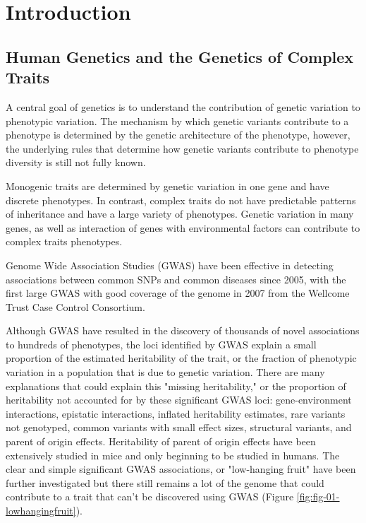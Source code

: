 \chapter{Introduction}

\section{Human Genetics and the Genetics of Complex Traits}

A central goal of genetics is to understand the contribution of genetic variation to phenotypic variation. The mechanism by which genetic variants contribute to a phenotype is determined by the genetic architecture of the phenotype, however, the underlying rules that determine how genetic variants contribute to phenotype diversity is still not fully known. 

Monogenic traits are determined by genetic variation in one gene and have discrete phenotypes. In contrast, complex traits do not have predictable patterns of inheritance and have a large variety of phenotypes. Genetic variation in many genes, as well as interaction of genes with environmental factors can contribute to complex traits phenotypes. 

Genome Wide Association Studies (GWAS) have been effective in detecting associations between common SNPs and common diseases since 2005, with the first large GWAS with good coverage of the genome in 2007 from the Wellcome Trust Case Control Consortium\cite{WellcomeTrustCaseControlConsortium:2007do}. 

Although GWAS have resulted in the discovery of thousands of novel associations to hundreds of phenotypes, the loci identified by GWAS explain a small proportion of the estimated heritability of the trait, or the fraction of phenotypic variation in a population that is due to genetic variation. There are many explanations that could explain this "missing heritability," or the proportion of heritability not accounted for by these significant GWAS loci: gene-environment interactions, epistatic interactions, inflated heritability estimates, rare variants not genotyped, common variants with small effect sizes, structural variants, and parent of origin effects\cite{Zaitlen2013,Eichler:2010kd,Gibson:2012kc,Zuk:cc}. Heritability of parent of origin effects have been extensively studied in mice\cite{Babak2008,Mott2014,Babak2015,Babak2012} and only beginning to be studied in humans\cite{Laurin:2017jv}. The clear and simple significant GWAS associations, or "low-hanging fruit" have been further investigated but there still remains a lot of the genome that could contribute to a trait that can't be discovered using GWAS (Figure \ref{fig:fig-01-lowhangingfruit}).

